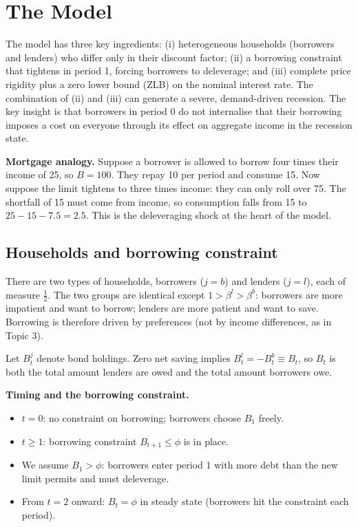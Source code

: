 \documentclass[11pt,a4paper]{article}
\begin{document}

\section{The Model}\label{sec:model}

The model has three key ingredients: (i) heterogeneous households (borrowers and lenders) who differ only in their discount factor; (ii) a borrowing constraint that tightens in period 1, forcing borrowers to deleverage; and (iii) complete price rigidity plus a zero lower bound (ZLB) on the nominal interest rate. The combination of (ii) and (iii) can generate a severe, demand-driven recession. The key insight is that borrowers in period 0 do not internalise that their borrowing imposes a cost on everyone through its effect on aggregate income in the recession state.

\textbf{Mortgage analogy.} Suppose a borrower is allowed to borrow four times their income of 25, so $B = 100$. They repay 10 per period and consume 15. Now suppose the limit tightens to three times income: they can only roll over 75. The shortfall of 15 must come from income, so consumption falls from 15 to $25 - 15 - 7.5 = 2.5$. This is the deleveraging shock at the heart of the model.

\subsection{Households and borrowing constraint}

There are two types of households, borrowers ($j=b$) and lenders ($j=l$), each of measure $\frac{1}{2}$. The two groups are identical except $1>\beta^l>\beta^b$: borrowers are more impatient and want to borrow; lenders are more patient and want to save. Borrowing is therefore driven by preferences (not by income differences, as in Topic 3).

Let $B_t^j$ denote bond holdings. Zero net saving implies $B_t^l = -B_t^b \equiv B_t$, so $B_t$ is both the total amount lenders are owed and the total amount borrowers owe.

\textbf{Timing and the borrowing constraint.}
\begin{itemize}
    \item $t=0$: no constraint on borrowing; borrowers choose $B_1$ freely.
    \item $t \geq 1$: borrowing constraint $B_{t+1} \leq \phi$ is in place.
    \item We assume $B_1 > \phi$: borrowers enter period 1 with more debt than the new limit permits and must deleverage.
    \item From $t=2$ onward: $B_t = \phi$ in steady state (borrowers hit the constraint each period).
\end{itemize}
\end{document}
